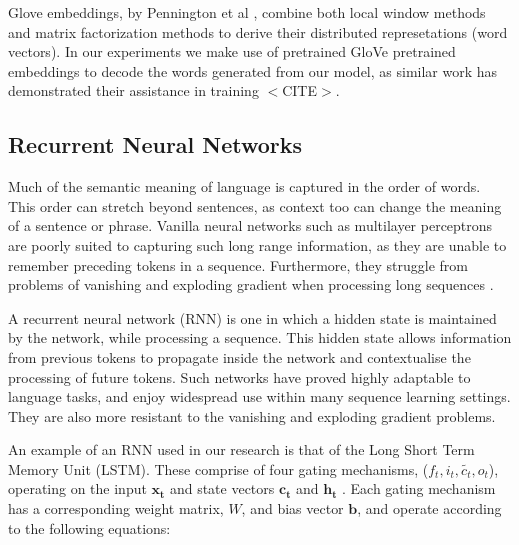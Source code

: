 Glove embeddings, by Pennington et al \cite{pennington_glove_2014}, combine both local window methods and matrix factorization methods to derive their distributed represetations (word vectors).  
In our experiments we make use of pretrained GloVe pretrained embeddings to decode the words generated from our model, as similar work has demonstrated their assistance in training $<$CITE$>$.

\subsection{Recurrent Neural Networks} %
\label{sub:recurrent_neural_networks}

Much of the semantic meaning of language is captured in the order of words. 
This order can stretch beyond sentences, as context too can change the meaning of a sentence or phrase.
Vanilla neural networks such as multilayer perceptrons are poorly suited to capturing such long range information, as they are unable to remember preceding tokens in a sequence. 
Furthermore, they struggle from problems of vanishing and exploding gradient when processing long sequences \cite{bengio_learning_1994}.

A recurrent neural network (RNN) is one in which a hidden state is maintained by the network, while processing a sequence.
This hidden state allows information from previous tokens to propagate inside the network and contextualise the processing of future tokens.
Such networks have proved highly adaptable to language tasks, and enjoy widespread use within many sequence learning settings\cite{lipton_critical_2015}. They are also more resistant to the vanishing and exploding gradient problems.

An example of an RNN used in our research is that of the Long Short Term Memory Unit (LSTM)\cite{hochreiter_long_1997}. These comprise of four gating mechanisms, ($f_t, i_t,\tilde{c_t}, o_t$), operating on the input $\mathbf{x_t}$ and state vectors $\mathbf{c_t}$ and $\mathbf{h_t}$
\cite{noauthor_understanding_nodate}. Each gating mechanism has a corresponding weight matrix, $W$, and bias vector $\mathbf{b}$, and operate according to the following equations:

